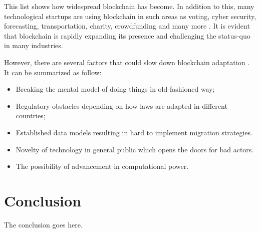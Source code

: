\documentclass[conference,compsoc]{IEEEtran}
\begin{document}
This list shows how widespread blockchain has become. 
In addition to this, many technological startups are using blockchain in such areas as voting, cyber security, forecasting, transportation, charity, crowdfunding and many more \cite{futurethinkers}. 
It is evident that blockchain is rapidly expanding its presence and challenging the status-quo in many industries. 

However, there are several factors that could slow down blockchain adaptation \cite{beyond}.
It can be summarized as follow:
\begin{itemize}
    \item Breaking the mental model of doing things in old-fashioned way;
    \item Regulatory obstacles depending on how laws are adapted in different countries;
    \item Established data models resulting in hard to implement migration strategies.
    \item Novelty of technology in general public which opens the doors for bad actors.
    \item The possibility of advancement in computational power.
\end{itemize}

\section{Conclusion}
The conclusion goes here.








\end{document}
